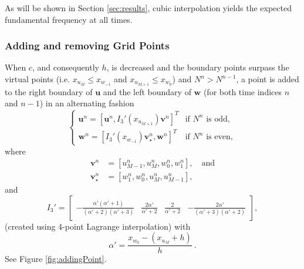 \documentclass[dvipsnames, reprint]{JASA}
\def\SWcomment[#1]{\textcolor{Bittersweet}{#1}}
\begin{document}
As will be shown in Section \ref{sec:results}, cubic interpolation yields the expected fundamental frequency at all times.%

\subsubsection{Adding and removing Grid Points}
When $c$, and consequently $h$, is decreased and the boundary points surpass the virtual points (i.e. $x_{u_M} \leq x_{w_{-1}}$ and $x_{u_{M+1}} \leq x_{w_0}$) and $N^n > N^{n-1}$, a point is added to the right boundary of $\mathbf{u}$ and the left boundary of $\mathbf{w}$ (for both time indices $n$ and $n-1$) in an alternating fashion  
\begin{equation}
        \begin{cases}\mathbf{u}^n = [\mathbf{u}^n, I_3'(x_{u_{M+1}})\mathbf{v}^n]^T & \text{if $N^n$ is odd},\\
        \mathbf{w}^n = [I_3'(x_{w_{-1}})\mathbf{v}_\star^n, \mathbf{w}^n]^T & \text{if $N^n$ is even},
        \end{cases}
\end{equation}
where 
\begin{align*}
\mathbf{v}^n &= [u_{M-1}^n, u_M^n, w_0^n, w_1^n], \quad\text{and}\\
    \mathbf{v}_\star^n &= [w_1^n, w_0^n, u_M^n, u_{M-1}^n],
\end{align*}
and
\begin{equation}\label{eq:customIp}
    I_3' = \begin{bmatrix} -\frac{\alpha'(\alpha'+1)}{(\alpha'+2)(\alpha'+3)} &\frac{2\alpha'}{\alpha'+2} &\frac{2}{\alpha'+2} 
    &-\frac{2\alpha'}{(\alpha'+3)(\alpha'+2)}
    \end{bmatrix},
\end{equation}
\SWcomment[(created using 4-point Lagrange interpolation)] with
\begin{equation}
    \alpha' = \frac{x_{w_0} - (x_{u_M} + h)}{h}\ .
\end{equation}
See Figure \ref{fig:addingPoint}.
\end{document}
